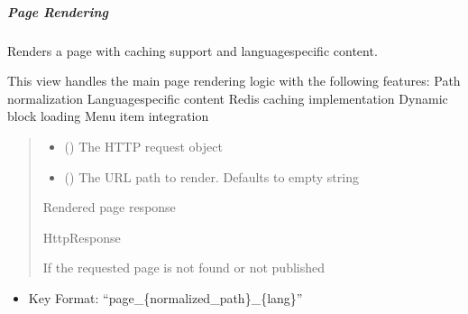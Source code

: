 \documentclass[letterpaper,10pt,english]{sphinxmanual}
\begin{document}
\subparagraph{Page Rendering}
\label{\detokenize{views/page:page-rendering}}

\begin{fulllineitems}
\label{\detokenize{views/page:pages_app.views.home.render_page}}
\pysigstartsignatures
\pysiglinewithargsret
{}
{\sphinxparamcomma {}}
{}
\pysigstopsignatures
\sphinxAtStartPar
Renders a page with caching support and language\sphinxhyphen{}specific content.

\sphinxAtStartPar
This view handles the main page rendering logic with the following features:
\sphinxhyphen{} Path normalization
\sphinxhyphen{} Language\sphinxhyphen{}specific content
\sphinxhyphen{} Redis caching implementation
\sphinxhyphen{} Dynamic block loading
\sphinxhyphen{} Menu item integration
\begin{quote}\begin{description}
\begin{itemize}
\item {} 
\sphinxAtStartPar
{} () \textendash{} The HTTP request object

\item {} 
\sphinxAtStartPar
{} (\sphinxstyleliteralemphasis{\sphinxupquote{, }}) \textendash{} The URL path to render. Defaults to empty string

\end{itemize}

\sphinxAtStartPar
Rendered page response

\sphinxAtStartPar
HttpResponse

\sphinxAtStartPar
{} \textendash{} If the requested page is not found or not published

\end{description}\end{quote}
\begin{description}
\begin{itemize}
\item {} 
\sphinxAtStartPar
Key Format: “page\_\{normalized\_path\}\_\{lang\}”


\end{itemize}
\end{description}
\end{fulllineitems}
\end{document}
